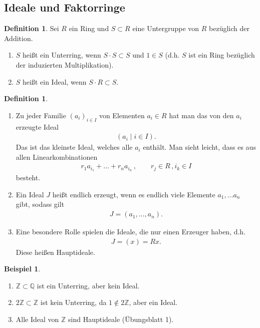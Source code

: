 \documentclass[reqno,12pt]{article}
\numberwithin{equation}{section}
\newcommand{\bQ}{\mathbb{Q}}
\newcommand{\bZ}{\mathbb{Z}}
\theoremstyle{plain}
\theoremstyle{definition}
\newtheorem{definition}[thm]{Definition}
\newtheorem{example}[thm]{Beispiel}
\begin{document}
\subsection{Ideale und Faktorringe}

\begin{definition}
Sei $R$ ein Ring und $S \subset R$ eine Untergruppe von $R$ bezüglich der Addition.

\begin{enumerate}
  \item $S$ heißt ein {\sf Unterring}, wenn $S \cdot S \subset S$ und $1 \in S$ (d.h. $S$ ist ein Ring bezüglich der induzierten Multiplikation).

  \item $S$ heißt ein {\sf Ideal}, wenn $S \cdot R \subset S$.
\end{enumerate}
\end{definition}

\begin{definition}
\
\begin{enumerate}
  \item Zu jeder Familie $(a_i)_{i \in I}$ von Elementen $a_i \in R$ hat man das von den $a_i$ erzeugte Ideal
  \begin{align*}
    ( a_i \mid i \in I ).
  \end{align*}
  Das ist das kleinste Ideal, welches alle $a_i$ enthält. Man sieht leicht, dass es aus allen Linearkombinationen
  \begin{align*}
    r_1a_{i_1} + \dots + r_na_{i_n} \, , \qquad r_j \in R \, , i_k \in I
  \end{align*}
  besteht.

  \item Ein Ideal $J$ heißt endlich erzeugt, wenn es endlich viele Elemente $a_1, \dots a_n$ gibt, sodass gilt
  \begin{align*}
    J = (a_1, \dots , a_n).
  \end{align*}

  \item Eine besondere Rolle spielen die Ideale, die nur einen Erzeuger haben, d.h.
  \begin{align*}
    J = (x)= Rx.
  \end{align*}
   Diese heißen {\sf Hauptideale}.
\end{enumerate}



\end{definition}

\begin{example}
\
\begin{enumerate}
  \item $\bZ \subset \bQ$ ist ein Unterring, aber kein Ideal.
  \item $2\bZ \subset \bZ$ ist kein Unterring, da $1 \notin 2 \bZ$, aber ein Ideal.
  \item Alle Ideal von $\bZ$ sind Hauptideale (Übungsblatt 1).
\end{enumerate}
\end{example}
\end{document}
